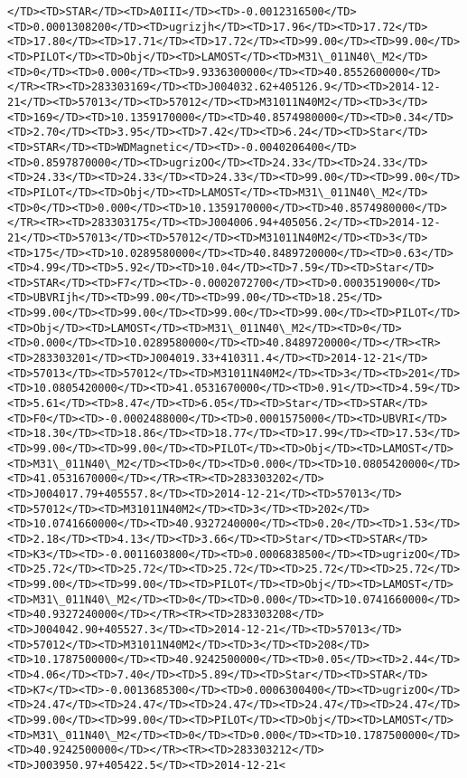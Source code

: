 \documentclass[11pt]{article}
\begin{document}
\begin{Verbatim}[commandchars=\\\{\}]
</TD><TD>STAR</TD><TD>A0III</TD><TD>-0.0012316500</TD><TD>0.0001308200</TD><TD>ugrizjh</TD><TD>17.96</TD><TD>17.72</TD><TD>17.80</TD><TD>17.71</TD><TD>17.72</TD><TD>99.00</TD><TD>99.00</TD><TD>PILOT</TD><TD>Obj</TD><TD>LAMOST</TD><TD>M31\_011N40\_M2</TD><TD>0</TD><TD>0.000</TD><TD>9.9336300000</TD><TD>40.8552600000</TD></TR><TR><TD>283303169</TD><TD>J004032.62+405126.9</TD><TD>2014-12-21</TD><TD>57013</TD><TD>57012</TD><TD>M31011N40M2</TD><TD>3</TD><TD>169</TD><TD>10.1359170000</TD><TD>40.8574980000</TD><TD>0.34</TD><TD>2.70</TD><TD>3.95</TD><TD>7.42</TD><TD>6.24</TD><TD>Star</TD><TD>STAR</TD><TD>WDMagnetic</TD><TD>-0.0040206400</TD><TD>0.8597870000</TD><TD>ugrizOO</TD><TD>24.33</TD><TD>24.33</TD><TD>24.33</TD><TD>24.33</TD><TD>24.33</TD><TD>99.00</TD><TD>99.00</TD><TD>PILOT</TD><TD>Obj</TD><TD>LAMOST</TD><TD>M31\_011N40\_M2</TD><TD>0</TD><TD>0.000</TD><TD>10.1359170000</TD><TD>40.8574980000</TD></TR><TR><TD>283303175</TD><TD>J004006.94+405056.2</TD><TD>2014-12-21</TD><TD>57013</TD><TD>57012</TD><TD>M31011N40M2</TD><TD>3</TD><TD>175</TD><TD>10.0289580000</TD><TD>40.8489720000</TD><TD>0.63</TD><TD>4.99</TD><TD>5.92</TD><TD>10.04</TD><TD>7.59</TD><TD>Star</TD><TD>STAR</TD><TD>F7</TD><TD>-0.0002072700</TD><TD>0.0003519000</TD><TD>UBVRIjh</TD><TD>99.00</TD><TD>99.00</TD><TD>18.25</TD><TD>99.00</TD><TD>99.00</TD><TD>99.00</TD><TD>99.00</TD><TD>PILOT</TD><TD>Obj</TD><TD>LAMOST</TD><TD>M31\_011N40\_M2</TD><TD>0</TD><TD>0.000</TD><TD>10.0289580000</TD><TD>40.8489720000</TD></TR><TR><TD>283303201</TD><TD>J004019.33+410311.4</TD><TD>2014-12-21</TD><TD>57013</TD><TD>57012</TD><TD>M31011N40M2</TD><TD>3</TD><TD>201</TD><TD>10.0805420000</TD><TD>41.0531670000</TD><TD>0.91</TD><TD>4.59</TD><TD>5.61</TD><TD>8.47</TD><TD>6.05</TD><TD>Star</TD><TD>STAR</TD><TD>F0</TD><TD>-0.0002488000</TD><TD>0.0001575000</TD><TD>UBVRI</TD><TD>18.30</TD><TD>18.86</TD><TD>18.77</TD><TD>17.99</TD><TD>17.53</TD><TD>99.00</TD><TD>99.00</TD><TD>PILOT</TD><TD>Obj</TD><TD>LAMOST</TD><TD>M31\_011N40\_M2</TD><TD>0</TD><TD>0.000</TD><TD>10.0805420000</TD><TD>41.0531670000</TD></TR><TR><TD>283303202</TD><TD>J004017.79+405557.8</TD><TD>2014-12-21</TD><TD>57013</TD><TD>57012</TD><TD>M31011N40M2</TD><TD>3</TD><TD>202</TD><TD>10.0741660000</TD><TD>40.9327240000</TD><TD>0.20</TD><TD>1.53</TD><TD>2.18</TD><TD>4.13</TD><TD>3.66</TD><TD>Star</TD><TD>STAR</TD><TD>K3</TD><TD>-0.0011603800</TD><TD>0.0006838500</TD><TD>ugrizOO</TD><TD>25.72</TD><TD>25.72</TD><TD>25.72</TD><TD>25.72</TD><TD>25.72</TD><TD>99.00</TD><TD>99.00</TD><TD>PILOT</TD><TD>Obj</TD><TD>LAMOST</TD><TD>M31\_011N40\_M2</TD><TD>0</TD><TD>0.000</TD><TD>10.0741660000</TD><TD>40.9327240000</TD></TR><TR><TD>283303208</TD><TD>J004042.90+405527.3</TD><TD>2014-12-21</TD><TD>57013</TD><TD>57012</TD><TD>M31011N40M2</TD><TD>3</TD><TD>208</TD><TD>10.1787500000</TD><TD>40.9242500000</TD><TD>0.05</TD><TD>2.44</TD><TD>4.06</TD><TD>7.40</TD><TD>5.89</TD><TD>Star</TD><TD>STAR</TD><TD>K7</TD><TD>-0.0013685300</TD><TD>0.0006300400</TD><TD>ugrizOO</TD><TD>24.47</TD><TD>24.47</TD><TD>24.47</TD><TD>24.47</TD><TD>24.47</TD><TD>99.00</TD><TD>99.00</TD><TD>PILOT</TD><TD>Obj</TD><TD>LAMOST</TD><TD>M31\_011N40\_M2</TD><TD>0</TD><TD>0.000</TD><TD>10.1787500000</TD><TD>40.9242500000</TD></TR><TR><TD>283303212</TD><TD>J003950.97+405422.5</TD><TD>2014-12-21<
\end{Verbatim}
\end{document}
